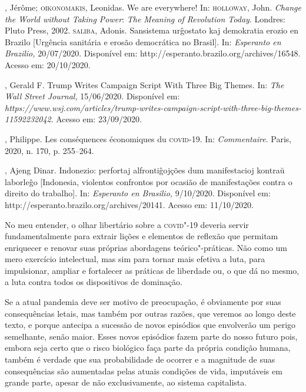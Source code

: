 \begin{bibliohedra}
, Jérôme; \textsc{oikonomakis}, Leonidas. We are everywhere! In: \textsc{holloway},
John. \emph{Change the World without Taking Power}: \emph{The Meaning of
Revolution Today}. Londres: Pluto Press, 2002. \textsc{saliba}, Adonis.
Sansistema urĝostato kaj demokratia erozio en Brazilo {[}Urgência
sanitária e erosão democrática no Brasil{]}. In: \emph{Esperanto en
Brazilio,} 20/07/2020. Disponível em:
http://esperanto.brazilo.org/archives/16548. Acesso em: 20/10/2020.

, Gerald F. Trump Writes Campaign Script With Three Big Themes. In:
\emph{The Wall Street Journal,} 15/06/2020. Disponível em:
\emph{https://www.wsj.com/articles/trump-writes-campaign-script-with-three-big-themes-11592232042}.
Acesso em: 23/09/2020.

, Philippe. Les conséquences économiques du \textsc{covid}-19. In:
\emph{Commentaire}. Paris, 2020, n. 170, p. 255--264.

, Ajeng Dinar. Indonezio: perfortaj alfrontiĝojções dum
manifestacioj kontraŭ laborleĝo {[}Indonesia, violentos confrontos por
ocasião de manifestações contra o direito do trabalho{]}. In:
\emph{Esperanto en Brasilio,} 9/10/2020. Disponível em:
http://esperanto.brazilo.org/archives/20141. Acesso em: 11/10/2020.
\end{bibliohedra}



\noindent{}No meu entender, o olhar libertário sobre a \textsc{covid}"-19 deveria servir
fundamentalmente para extrair lições e elementos de reflexão que
permitam enriquecer e renovar suas próprias abordagens teórico"-práticas.
Não como um mero exercício intelectual, mas sim para tornar mais efetiva
a luta, para impulsionar, ampliar e fortalecer as práticas de liberdade
ou, o que dá no mesmo, a luta contra todos os dispositivos de dominação.

Se a atual pandemia deve ser motivo de preocupação, é obviamente por
suas consequências letais, mas também por outras razões, que veremos ao
longo deste texto, e porque antecipa a sucessão de novos episódios que
envolverão um perigo semelhante, senão maior. Esses novos episódios
fazem parte do nosso futuro pois, embora seja certo que o risco
biológico faça parte da própria condição humana, também é verdade que
sua probabilidade de ocorrer e a magnitude de suas consequências são
aumentadas pelas atuais condições de vida, imputáveis em grande parte,
apesar de não exclusivamente, ao sistema capitalista.

